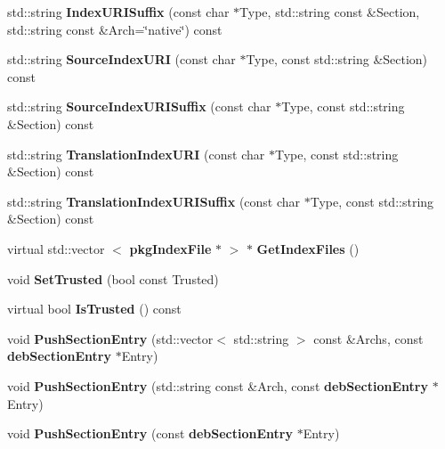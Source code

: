 \begin{DoxyCompactItemize}
\item 
std\-::string {\bfseries \-Index\-U\-R\-I\-Suffix} (const char $\ast$\-Type, std\-::string const \&\-Section, std\-::string const \&\-Arch=\char`\"{}native\char`\"{}) const \label{classdebReleaseIndex_a0463956f69d82140cfe10981df68b738}

\item 
std\-::string {\bfseries \-Source\-Index\-U\-R\-I} (const char $\ast$\-Type, const std\-::string \&\-Section) const \label{classdebReleaseIndex_a5e9492021b0662702e0a3f7dd9250a5d}

\item 
std\-::string {\bfseries \-Source\-Index\-U\-R\-I\-Suffix} (const char $\ast$\-Type, const std\-::string \&\-Section) const \label{classdebReleaseIndex_a0f11fb8020f74382a3591260195aabbb}

\item 
std\-::string {\bfseries \-Translation\-Index\-U\-R\-I} (const char $\ast$\-Type, const std\-::string \&\-Section) const \label{classdebReleaseIndex_a83a5439eb4c4d7bbfd9101e9bb140055}

\item 
std\-::string {\bfseries \-Translation\-Index\-U\-R\-I\-Suffix} (const char $\ast$\-Type, const std\-::string \&\-Section) const \label{classdebReleaseIndex_aaab31ba3e74ad9b24b5db72e734b9021}

\item 
virtual std\-::vector\*
$<$ {\bf pkg\-Index\-File} $\ast$ $>$ $\ast$ {\bfseries \-Get\-Index\-Files} ()\label{classdebReleaseIndex_a5655f69c85faa05d81bda49ca055f7c6}

\item 
void {\bfseries \-Set\-Trusted} (bool const \-Trusted)\label{classdebReleaseIndex_a7b5b3855e80aa0b93b6b962681c77463}

\item 
virtual bool {\bfseries \-Is\-Trusted} () const \label{classdebReleaseIndex_aff34485f3c8499f45169fc6ab7e39409}

\item 
void {\bfseries \-Push\-Section\-Entry} (std\-::vector$<$ std\-::string $>$ const \&\-Archs, const {\bf deb\-Section\-Entry} $\ast$\-Entry)\label{classdebReleaseIndex_ad162d892b5252f61a1a0ba8b5b0211da}

\item 
void {\bfseries \-Push\-Section\-Entry} (std\-::string const \&\-Arch, const {\bf deb\-Section\-Entry} $\ast$\-Entry)\label{classdebReleaseIndex_a6b640517ef1bff279c879e0fa1fe8377}

\item 
void {\bfseries \-Push\-Section\-Entry} (const {\bf deb\-Section\-Entry} $\ast$\-Entry)\label{classdebReleaseIndex_a39f40f8e063d5b18d28a9772fc762ef6}

\end{DoxyCompactItemize}


